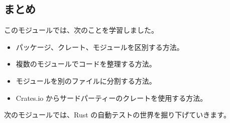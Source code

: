 \subsection{まとめ}

このモジュールでは、次のことを学習しました。

\begin{itemize}
\item パッケージ、クレート、モジュールを区別する方法。
\item 複数のモジュールでコードを整理する方法。
\item モジュールを別のファイルに分割する方法。
\item Crates.io からサードパーティーのクレートを使用する方法。
\end{itemize}

次のモジュールでは、Rust の自動テストの世界を掘り下げていきます。